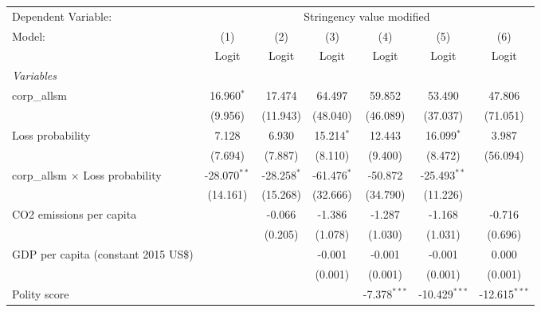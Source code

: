 
\begingroup
\centering
\begin{tabular}{lcccccc}
   \toprule
   Dependent Variable: & \multicolumn{6}{c}{Stringency value modified}\\
   Model:                                  & (1)            & (2)           & (3)           & (4)            & (5)             & (6)\\  
                                           &  Logit         & Logit         & Logit         & Logit          & Logit           & Logit\\  
   \midrule
   \emph{Variables}\\
   corp\_allsm                             & 16.960$^{*}$   & 17.474        & 64.497        & 59.852         & 53.490          & 47.806\\   
                                           & (9.956)        & (11.943)      & (48.040)      & (46.089)       & (37.037)        & (71.051)\\   
   Loss probability                        & 7.128          & 6.930         & 15.214$^{*}$  & 12.443         & 16.099$^{*}$    & 3.987\\   
                                           & (7.694)        & (7.887)       & (8.110)       & (9.400)        & (8.472)         & (56.094)\\   
   corp\_allsm $\times$ Loss probability   & -28.070$^{**}$ & -28.258$^{*}$ & -61.476$^{*}$ & -50.872        & -25.493$^{**}$  &   \\   
                                           & (14.161)       & (15.268)      & (32.666)      & (34.790)       & (11.226)        &   \\   
   CO2 emissions per capita                &                & -0.066        & -1.386        & -1.287         & -1.168          & -0.716\\   
                                           &                & (0.205)       & (1.078)       & (1.030)        & (1.031)         & (0.696)\\   
   GDP per capita (constant 2015 US\$)     &                &               & -0.001        & -0.001         & -0.001          & 0.000\\   
                                           &                &               & (0.001)       & (0.001)        & (0.001)         & (0.001)\\   
   Polity score                            &                &               &               & -7.378$^{***}$ & -10.429$^{***}$ & -12.615$^{***}$\\   

\end{tabular}
